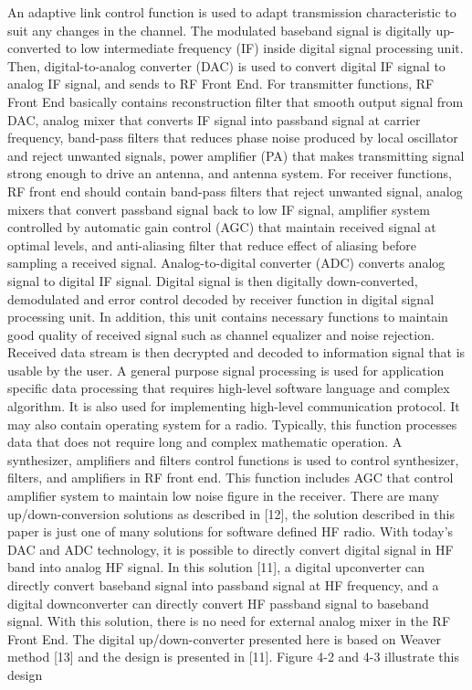 \documentclass[conference]{IEEEtran}
\begin{document}
An adaptive link control function is used to adapt transmission characteristic to suit any changes in the channel. The modulated baseband signal is digitally up-converted to low intermediate frequency (IF) inside digital signal processing unit. Then, digital-to-analog converter (DAC) is used to convert digital IF signal to analog IF signal, and sends to RF Front End. For transmitter functions, RF Front End basically contains reconstruction filter that smooth output signal from DAC, analog mixer that converts IF signal into passband signal at carrier frequency, band-pass filters that reduces phase noise produced by local oscillator and reject unwanted signals, power amplifier (PA) that makes transmitting signal strong enough to drive an antenna, and antenna system. 
For receiver functions, RF front end should contain band-pass filters that reject unwanted signal, analog mixers that convert passband signal back to low IF signal, amplifier system controlled by automatic gain control (AGC) that maintain received signal at optimal levels, and anti-aliasing filter that reduce effect of aliasing before sampling a received signal. Analog-to-digital converter (ADC) converts analog signal to digital IF signal. Digital signal is then digitally down-converted, demodulated and error control decoded by receiver function in digital signal processing unit. In addition, this unit contains necessary functions to maintain good quality of received signal such as channel equalizer and noise rejection. Received data stream is then decrypted and decoded to information signal that is usable by the user. 
A general purpose signal processing is used for application specific data processing that requires high-level software language and complex algorithm. It is also used for implementing high-level communication protocol. It may also contain operating system for a radio. Typically, this function processes data that does not require long and complex mathematic operation. 
A synthesizer, amplifiers and filters control functions is used to control synthesizer, filters, and amplifiers in RF front end. This function includes AGC that control amplifier system to maintain low noise figure in the receiver. 
There are many up/down-conversion solutions as described in [12], the solution described in this paper is just one of many solutions for software defined HF radio. With today’s DAC and ADC technology, it is possible to directly convert digital signal in HF band into analog HF signal. In this solution [11], a digital upconverter can directly convert baseband signal into passband signal at HF frequency, and a digital downconverter can directly convert HF passband signal to baseband signal. With this solution, there is no need for external analog mixer in the RF Front End. The digital up/down-converter presented here is based on Weaver method [13] and the design is presented in [11]. Figure 4-2 and 4-3 illustrate this design
\end{document}
